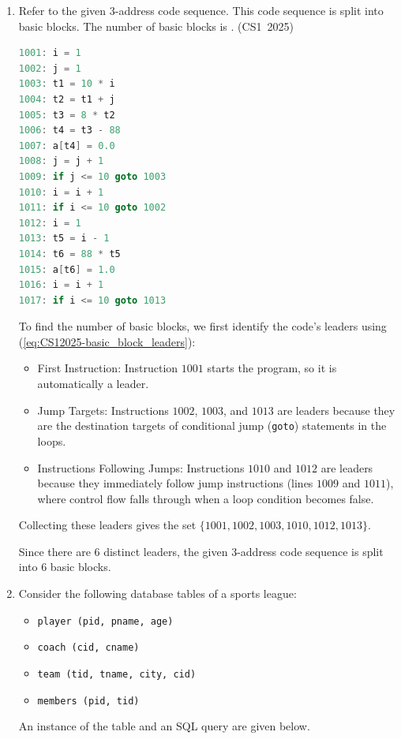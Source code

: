 \begin{enumerate}[label=\thesubsection.\arabic*, ref=\thesubsection.\theenumi]
Since it satisfies monoid axioms and commutativity without having inverses, $(F, \odot)$ is an Abelian monoid. Therefore, option (b) is correct.

\vspace{0.5cm}
\item Refer to the given 3-address code sequence. This code sequence is split into basic blocks. The number of basic blocks is \underline{\hspace{1cm}}.
\hfill (CS1~2025)
\begin{lstlisting}[language=C]
1001: i = 1
1002: j = 1
1003: t1 = 10 * i
1004: t2 = t1 + j
1005: t3 = 8 * t2
1006: t4 = t3 - 88
1007: a[t4] = 0.0
1008: j = j + 1
1009: if j <= 10 goto 1003
1010: i = i + 1
1011: if i <= 10 goto 1002
1012: i = 1
1013: t5 = i - 1
1014: t6 = 88 * t5
1015: a[t6] = 1.0
1016: i = i + 1
1017: if i <= 10 goto 1013
\end{lstlisting}

\vspace{0.2cm}
\solution
To find the number of basic blocks, we first identify the code's leaders using (\ref{eq:CS12025-basic_block_leaders}):
\begin{itemize}
    \item First Instruction: Instruction $1001$ starts the program, so it is automatically a leader.
    \item Jump Targets: Instructions $1002$, $1003$, and $1013$ are leaders because they are the destination targets of conditional jump (\texttt{goto}) statements in the loops.
    \item Instructions Following Jumps: Instructions $1010$ and $1012$ are leaders because they immediately follow jump instructions (lines $1009$ and $1011$), where control flow falls through when a loop condition becomes false.
\end{itemize}

Collecting these leaders gives the set $\{1001, 1002, 1003, 1010, 1012, 1013\}$. 

Since there are $6$ distinct leaders, the given 3-address code sequence is split into $6$ basic blocks.

\vspace{0.5cm}
\item Consider the following database tables of a sports league:
\begin{itemize}
    \item \texttt{player (pid, pname, age)}
    \item \texttt{coach (cid, cname)}
    \item \texttt{team (tid, tname, city, cid)}
    \item \texttt{members (pid, tid)}
\end{itemize}
An instance of the table and an SQL query are given below.


\end{enumerate}
